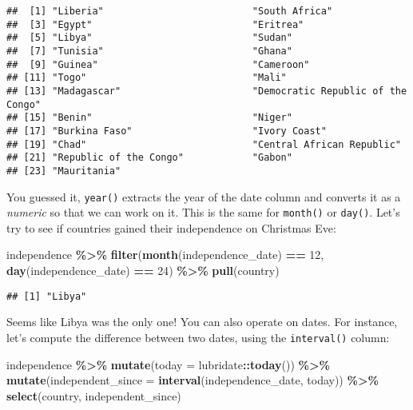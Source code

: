 \documentclass[
]{article}
\newenvironment{Shaded}{\begin{snugshade}}{\end{snugshade}}
\newcommand{\DataTypeTok}[1]{\textcolor[rgb]{0.13,0.29,0.53}{#1}}
\newcommand{\DecValTok}[1]{\textcolor[rgb]{0.00,0.00,0.81}{#1}}
\newcommand{\KeywordTok}[1]{\textcolor[rgb]{0.13,0.29,0.53}{\textbf{#1}}}
\newcommand{\NormalTok}[1]{#1}
\newcommand{\OperatorTok}[1]{\textcolor[rgb]{0.81,0.36,0.00}{\textbf{#1}}}
\newcommand{\StringTok}[1]{\textcolor[rgb]{0.31,0.60,0.02}{#1}}
\begin{document}
\begin{verbatim}
##  [1] "Liberia"                          "South Africa"                    
##  [3] "Egypt"                            "Eritrea"                         
##  [5] "Libya"                            "Sudan"                           
##  [7] "Tunisia"                          "Ghana"                           
##  [9] "Guinea"                           "Cameroon"                        
## [11] "Togo"                             "Mali"                            
## [13] "Madagascar"                       "Democratic Republic of the Congo"
## [15] "Benin"                            "Niger"                           
## [17] "Burkina Faso"                     "Ivory Coast"                     
## [19] "Chad"                             "Central African Republic"        
## [21] "Republic of the Congo"            "Gabon"                           
## [23] "Mauritania"
\end{verbatim}

You guessed it, \texttt{year()} extracts the year of the date column and converts it as a \emph{numeric} so that we can work
on it. This is the same for \texttt{month()} or \texttt{day()}. Let's try to see if countries gained their independence on
Christmas Eve:

\begin{Shaded}
\begin{Highlighting}[]
\NormalTok{independence }\OperatorTok{\%\textgreater{}\%}
\StringTok{  }\KeywordTok{filter}\NormalTok{(}\KeywordTok{month}\NormalTok{(independence\_date) }\OperatorTok{==}\StringTok{ }\DecValTok{12}\NormalTok{,}
         \KeywordTok{day}\NormalTok{(independence\_date) }\OperatorTok{==}\StringTok{ }\DecValTok{24}\NormalTok{) }\OperatorTok{\%\textgreater{}\%}
\StringTok{  }\KeywordTok{pull}\NormalTok{(country)}
\end{Highlighting}
\end{Shaded}

\begin{verbatim}
## [1] "Libya"
\end{verbatim}

Seems like Libya was the only one! You can also operate on dates. For instance, let's compute the difference between
two dates, using the \texttt{interval()} column:

\begin{Shaded}
\begin{Highlighting}[]
\NormalTok{independence }\OperatorTok{\%\textgreater{}\%}
\StringTok{  }\KeywordTok{mutate}\NormalTok{(}\DataTypeTok{today =}\NormalTok{ lubridate}\OperatorTok{::}\KeywordTok{today}\NormalTok{()) }\OperatorTok{\%\textgreater{}\%}
\StringTok{  }\KeywordTok{mutate}\NormalTok{(}\DataTypeTok{independent\_since =} \KeywordTok{interval}\NormalTok{(independence\_date, today)) }\OperatorTok{\%\textgreater{}\%}
\StringTok{  }\KeywordTok{select}\NormalTok{(country, independent\_since)}
\end{Highlighting}
\end{Shaded}
\end{document}
